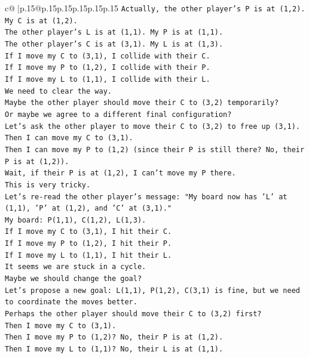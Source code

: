 \documentclass{article}
\begin{document}
{\begin{supertabular}{c@{$\;$}|p{.15\linewidth}@{}p{.15\linewidth}p{.15\linewidth}p{.15\linewidth}p{.15\linewidth}p{.15\linewidth}}
{{{\texttt{Actually, the other player's P is at (1,2). My C is at (1,2).} \\
\texttt{The other player's L is at (1,1). My P is at (1,1).} \\
\texttt{The other player's C is at (3,1). My L is at (1,3).} \\
\texttt{If I move my C to (3,1), I collide with their C.} \\
\texttt{If I move my P to (1,2), I collide with their P.} \\
\texttt{If I move my L to (1,1), I collide with their L.} \\
\texttt{We need to clear the way.} \\
\texttt{Maybe the other player should move their C to (3,2) temporarily?} \\
\texttt{Or maybe we agree to a different final configuration?} \\
\texttt{Let's ask the other player to move their C to (3,2) to free up (3,1).} \\
\texttt{Then I can move my C to (3,1).} \\
\texttt{Then I can move my P to (1,2) (since their P is still there? No, their P is at (1,2)).} \\
\texttt{Wait, if their P is at (1,2), I can't move my P there.} \\
\texttt{This is very tricky.} \\
\texttt{Let's re{-}read the other player's message: "My board now has 'L' at (1,1), 'P' at (1,2), and 'C' at (3,1)."} \\
\texttt{My board: P(1,1), C(1,2), L(1,3).} \\
\texttt{If I move my C to (3,1), I hit their C.} \\
\texttt{If I move my P to (1,2), I hit their P.} \\
\texttt{If I move my L to (1,1), I hit their L.} \\
\texttt{It seems we are stuck in a cycle.} \\
\texttt{Maybe we should change the goal?} \\
\texttt{Let's propose a new goal: L(1,1), P(1,2), C(3,1) is fine, but we need to coordinate the moves better.} \\
\texttt{Perhaps the other player should move their C to (3,2) first?} \\
\texttt{Then I move my C to (3,1).} \\
\texttt{Then I move my P to (1,2)? No, their P is at (1,2).} \\
\texttt{Then I move my L to (1,1)? No, their L is at (1,1).} \\
}}}
\end{supertabular}}
\end{document}
